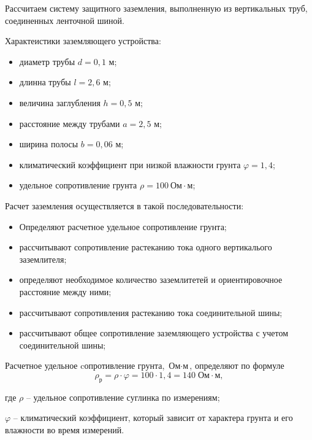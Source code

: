         Рассчитаем систему защитного заземления, выполненную из вертикальных
        труб, соединенных ленточной шиной.

        Характеистики заземляющего устройства:
        \begin{itemize}
            \item диаметр трубы $d = 0,1$ м;
            \item длинна трубы  $l = 2,6$ м;
            \item величина заглубления $h = 0,5$ м;
            \item расстояние между трубами $a = 2,5$ м;
            \item ширина полосы $b = 0,06$ м;
            \item климатический коэффициент при низкой влажности грунта 
                $\varphi = 1,4$;
            \item удельное сопротивление грунта 
                $\rho = 100 \ \text{Ом} \cdot \text{м}$;
        \end{itemize}

        Расчет заземления осуществляется в такой последовательности:
        \begin{itemize}
            \item Определяют расчетное удельное сопротивление грунта;
            \item рассчитывают сопротивление растеканию тока одного
                вертикалього заземлителя;
            \item определяют необходимое количество заземлитетей и
                ориентировочное расстояние между ними;
            \item рассчитывают сопротивления растеканию тока соединительной
                шины;
            \item рассчитывают общее сопротивление заземляющего устройства с
                учетом соединительной шины;
        \end{itemize}

        Расчетное удельное cопротивление грунта, $\text{Ом} \cdot
        \text{м}$, определяют по формуле
        \begin{equation*}
            \rho_\text{р} = \rho \cdot \varphi =
                100 \cdot 1,4 = 140 \; \text{Ом} \cdot \text{м},
        \end{equation*}

        где $\rho$ -- удельное сопротивление суглинка по измерениям;\par
        $\varphi$ -- климатический коэффициент, который зависит от характера
        грунта и его влажности во время измерений.

